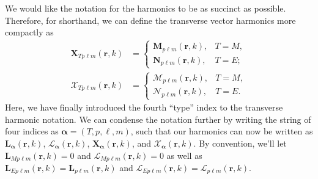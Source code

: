 We would like the notation for the harmonics to be as succinct as possible. Therefore, for shorthand, we can define the transverse vector harmonics more compactly as
\begin{equation}
\begin{split}
\mathbf{X}_{Tp\ell m}(\mathbf{r},k) &= 
\begin{cases}
\mathbf{M}_{p\ell m}(\mathbf{r},k), & T=M,\\
\mathbf{N}_{p\ell m}(\mathbf{r},k), & T=E;
\end{cases}\\[1.0em]
\bm{\mathcal{X}}_{Tp\ell m}(\mathbf{r},k) &=
\begin{cases}
\bm{\mathcal{M}}_{p\ell m}(\mathbf{r},k), & T=M,\\
\bm{\mathcal{N}}_{p\ell m}(\mathbf{r},k), & T=E.
\end{cases}
\end{split}
\end{equation}
Here, we have finally introduced the fourth ``type'' index to the transverse harmonic notation. We can condense the notation further by writing the string of four indices as $\bm{\alpha} = (T,p,\ell,m)$, such that our harmonics can now be written as $\mathbf{L}_{\bm{\alpha}}(\mathbf{r},k)$, $\bm{\mathcal{L}}_{\bm{\alpha}}(\mathbf{r},k)$, $\mathbf{X}_{\bm{\alpha}}(\mathbf{r},k)$, and $\bm{\mathcal{X}}_{\bm{\alpha}}(\mathbf{r},k)$. By convention, we'll let $\mathbf{L}_{Mp\ell m}(\mathbf{r},k) = 0$ and $\bm{\mathcal{L}}_{Mp\ell m}(\mathbf{r},k) = 0$ as well as $\mathbf{L}_{Ep\ell m}(\mathbf{r},k) = \mathbf{L}_{p\ell m}(\mathbf{r},k)$ and $\bm{\mathcal{L}}_{Ep\ell m}(\mathbf{r},k) = \bm{\mathcal{L}}_{p\ell m}(\mathbf{r},k)$.

